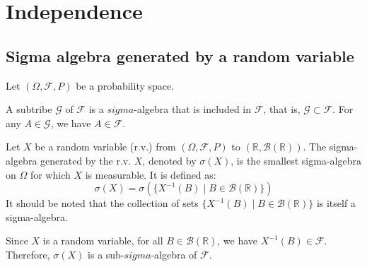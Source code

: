 \chapter{Independence}
\sloppy%
\section{Sigma algebra generated by a random variable}%
Let $(\Omega, \mathcal{F}, P)$ be a probability space.%
\begin{definition}
A subtribe $\mathcal{G}$ of $\mathcal{F}$ is a $sigma$-algebra that is included in $\mathcal{F}$, that is, $\mathcal{G} \subset \mathcal{F}$. For any $A \in \mathcal{G}$, we have $A \in \mathcal{F}$.
\end{definition}%
\begin{definition}
Let $X$ be a random variable (r.v.) from $(\Omega, \mathcal{F}, P)$ to $(\mathbb{R}, \mathcal{B}(\mathbb{R}))$. The sigma-algebra generated by the r.v. $X$, denoted by $\sigma(X)$, is the smallest sigma-algebra on $\Omega$ for which $X$ is measurable. It is defined as:
\[ \sigma(X) = \sigma(\{X^{-1}(B) \mid B \in \mathcal{B}(\mathbb{R})\}) \]
It should be noted that the collection of sets $\{X^{-1}(B) \mid B \in \mathcal{B}(\mathbb{R})\}$ is itself a sigma-algebra.
\end{definition}%
Since $X$ is a random variable, for all $B \in \mathcal{B}(\mathbb{R})$, we have $X^{-1}(B) \in \mathcal{F}$. Therefore, $\sigma(X)$ is a sub-$sigma$-algebra of $\mathcal{F}$.%
